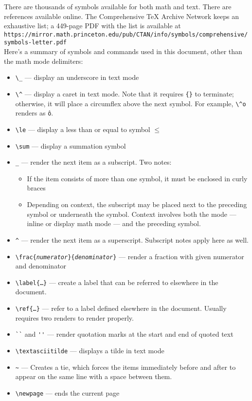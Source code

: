 \documentclass{article}
\begin{document}
There are thousands of symbols available for both math and text. There are
references available online. The Comprehensive \TeX{} Archive Network keeps an
exhaustive list; a 449-page PDF with the list is available at\\[12pt]
{\tt https://mirror.math.princeton.edu/pub/CTAN/info/symbols/comprehensive/%
symbols-letter.pdf}\\[12pt]

Here's a summary of symbols and commands used in this document, other than the
math mode delimiters:
\begin{itemize}
  \item {\tt \textbackslash \_} --- display an underscore in text mode
  \item {\tt \textbackslash \^{}} --- display a caret in text mode. Note that it
  requires {\tt \{\}} to terminate; otherwise, it will place a circumflex above
  the next symbol. For example, {\tt \textbackslash \^{}o} renders as {\tt \^o}.
  \item {\tt \textbackslash le} --- display a less than or equal to symbol $\le$
  \item {\tt \textbackslash sum} --- display a summation symbol
  \item {\tt \_} --- render the next item as a subscript. Two notes:
  \begin{itemize}
    \item If the item consists of more than one symbol, it must be enclosed in
    curly braces
    \item Depending on context, the subscript may be placed next to the
    preceding symbol or underneath the symbol. Context involves both the mode
    --- inline or display math mode --- and the preceding symbol.
  \end{itemize}
  \item {\tt \^{}} --- render the next item as a superscript. Subscript notes
  apply here as well.
  \item {\tt \textbackslash frac\{\emph{numerator}\}\{\emph{denominator}\}} ---
  render a fraction with given numerator and denominator
  \item {\tt \textbackslash label\{\ldots\}} --- create a label that can be
  referred to elsewhere in the document.
  \item {\tt \textbackslash ref\{\ldots\}} --- refer to a label defined
  elsewhere in the document. Usually requires two renders to render properly.
  \item {\tt \`{}\`{}} and {\tt \'{}\'{}} --- render quotation marks at the
  start and end of quoted text
  \item {\tt \textbackslash textasciitilde} --- displays a tilde in text mode
  \item {\tt \textasciitilde} --- Creates a tie, which forces the items
  immediately before and after to appear on the same line with a space between
  them.
  \item {\tt \textbackslash newpage} --- ends the current page
\end{itemize}
\end{document}
